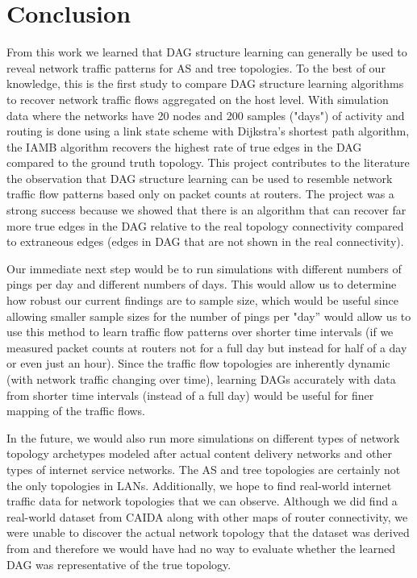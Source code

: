 \documentclass[conference]{IEEEtran}
\begin{document}
\section{Conclusion}

From this work we learned that DAG structure learning can generally be used to reveal network traffic patterns for AS and tree topologies. To the best of our knowledge, this is the first study to compare DAG structure learning algorithms to recover network traffic flows aggregated on the host level. With simulation data where the networks have 20 nodes and 200 samples ("days") of activity and routing is done using a link state scheme with Dijkstra's shortest path algorithm, the IAMB algorithm recovers the highest rate of true edges in the DAG compared to the ground truth topology. This project contributes to the literature the observation that DAG structure learning can be used to resemble network traffic flow patterns based only on packet counts at routers. The project was a strong success because we showed that there is an algorithm that can recover far more true edges in the DAG relative to the real topology connectivity compared to extraneous edges (edges in DAG that are not shown in the real connectivity).

Our immediate next step would be to run simulations with different numbers of pings per day and different numbers of days. This would allow us to determine how robust our current findings are to sample size, which would be useful since allowing smaller sample sizes for the number of pings per "day” would allow us to use this method to learn traffic flow patterns over shorter time intervals (if we measured packet counts at routers not for a full day but instead for half of a day or even just an hour). Since the traffic flow topologies are inherently dynamic (with network traffic changing over time), learning DAGs accurately with data from shorter time intervals (instead of a full day) would be useful for finer mapping of the traffic flows.

In the future, we would also run more simulations on different types of network topology archetypes modeled after actual content delivery networks and other types of internet service networks. The AS and tree topologies are certainly not the only topologies in LANs. Additionally, we hope to find real-world internet traffic data for network topologies that we can observe. Although we did find a real-world dataset from CAIDA along with other maps of router connectivity, we were unable to discover the actual network topology that the dataset was derived from and therefore we would have had no way to evaluate whether the learned DAG was representative of the true topology.
\end{document}
